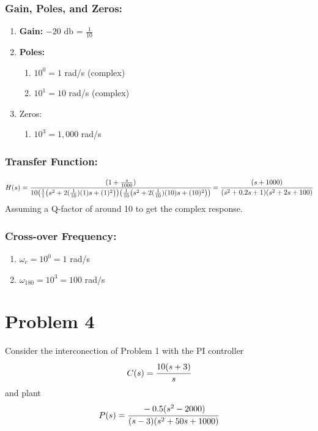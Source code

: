 \documentclass[letter]{article}
\numberwithin{equation}{section}
\begin{document}
\subsubsection{Gain, Poles, and Zeros:}
\begin{enumerate}
	\item \textbf{Gain:}  $-20$ db = $\frac{1}{10}$
	\item \textbf{Poles:}
	\begin{enumerate}
		\item $10^{0} = 1$ rad/s (complex)
		\item $10^{1} = 10$ rad/s (complex)
	\end{enumerate}
	\item Zeros:
	\begin{enumerate}
		\item $10^{3} = 1,000$ rad/s
	\end{enumerate}
\end{enumerate}

\subsubsection{Transfer Function:}\[
	H(s) = \cfrac{
			(1 + \frac{s}{1000})
		}{
			10 \qty(
				\frac{1}{1}\qty(s^2 + 2(\frac{1}{10})(1)s + (1)^2)
			) \qty(
				\frac{1}{10}\qty(s^2 + 2(\frac{1}{10})(10)s + (10)^2)
			)
		} = \cfrac{
			(s+1000)
		}{
			\qty(s^2 + 0.2 s + 1) \qty(s^2 + 2s + 100)
		}
\]
Assuming a Q-factor of around 10 to get the complex response.


\subsubsection{Cross-over Frequency:}
\begin{enumerate}
	\item $\omega_c = 10^{0} = 1$ rad/s
	\item $\omega_{180} = 10^{3} = 100$ rad/s
\end{enumerate}



\newpage
\section{Problem 4}
Consider the interconection of Problem 1 with the PI controller\[
	C(s) = \cfrac{10 (s+3)}{s}
\] and plant \[
	P(s) = \cfrac{-0.5(s^2 - 2000)}{(s-3)(s^2 + 50s + 1000)}
\]
\end{document}
